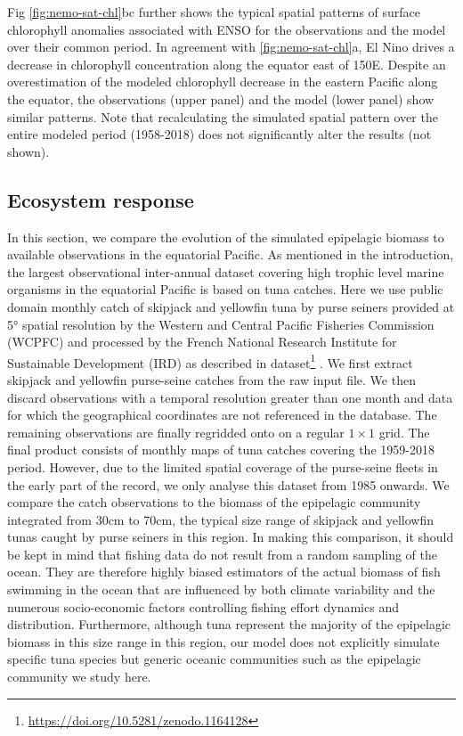 Fig \ref{fig:nemo-sat-chl}bc further shows the typical spatial patterns of surface chlorophyll anomalies associated with ENSO for the observations and the model over their common period. In agreement with \ref{fig:nemo-sat-chl}a, El Nino drives a decrease in chlorophyll concentration along the equator east of 150\degree{}E. Despite an overestimation of the modeled chlorophyll decrease in the eastern Pacific along the equator, the observations (upper panel) and the model (lower panel) show similar patterns. Note that recalculating the simulated spatial pattern over the entire modeled period (1958-2018) does not significantly alter the results (not shown). 

\subsection{Ecosystem response}

In this section, we compare the evolution of the simulated epipelagic biomass to available observations in the equatorial Pacific. As mentioned in the introduction, the largest observational inter-annual dataset covering high trophic level marine organisms in the equatorial Pacific is based on tuna catches. Here we use public domain monthly catch of skipjack and yellowfin tuna by purse seiners provided at 5° spatial resolution by the Western and Central Pacific Fisheries Commission (WCPFC) and processed by the French National Research Institute for Sustainable Development (IRD) as described in dataset\footnote{\url{https://doi.org/10.5281/zenodo.1164128}} \citep{taconetGlobalMonthlyCatch2018}. We first extract skipjack and yellowfin purse-seine catches from the raw input file. We then discard observations with a temporal resolution greater than one month and data for which the geographical coordinates are not referenced in the database. The remaining observations are finally regridded onto on a regular $1 \times 1$ grid. The final product consists of monthly maps of tuna catches  covering the 1959-2018 period. However, due to the limited spatial coverage of the purse-seine fleets in the early part of the record, we only analyse this dataset from 1985 onwards. We compare the catch observations to the biomass of the epipelagic community integrated from 30cm to 70cm, the typical size range of  skipjack and yellowfin tunas caught by purse seiners in this region. In making this comparison, it should be kept in mind that fishing data do not result from a random sampling of the ocean. They are therefore highly biased estimators of the actual biomass of fish swimming in the ocean that are influenced by both climate variability and the numerous socio-economic factors controlling fishing effort dynamics and distribution. Furthermore, although tuna represent the majority of the epipelagic biomass in this size range in this region, our model does not explicitly simulate specific tuna species but generic oceanic communities such as the epipelagic community we study here.

